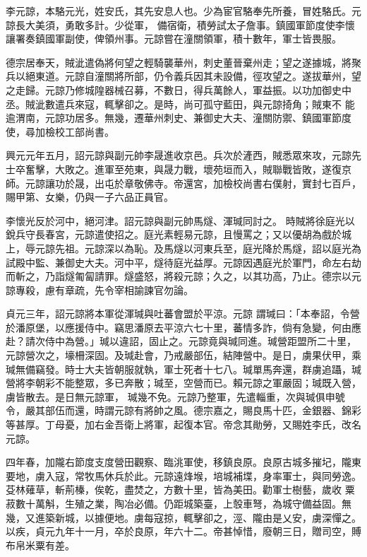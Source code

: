 \begin{pinyinscope}
 李元諒，本駱元光，姓安氏，其先安息人也。少為宦官駱奉先所養，冒姓駱氏。元諒長大美須，勇敢多計。少從軍，
 備宿衛，積勞試太子詹事。鎮國軍節度使李懷讓署奏鎮國軍副使，俾領州事。元諒嘗在潼關領軍，積十數年，軍士皆畏服。



 德宗居奉天，賊泚遣偽將何望之輕騎襲華州，刺史董晉棄州走；望之遂據城，將聚兵以絕東道。元諒自潼關將所部，仍令義兵因其未設備，徑攻望之。遂拔華州，望之走歸。元諒乃修城隍器械召募，不數日，得兵萬餘人，軍益振。以功加御史中丞。賊泚數遣兵來寇，輒擊卻之。是時，尚可孤守藍田，與元諒掎角；賊東不
 能逾渭南，元諒功居多。無幾，遷華州刺史、兼御史大夫、潼關防禦、鎮國軍節度使，尋加檢校工部尚書。



 興元元年五月，詔元諒與副元帥李晟進收京邑。兵次於滻西，賊悉眾來攻，元諒先士卒奮擊，大敗之。進軍至苑東，與晟力戰，壞苑垣而入，賊聯戰皆敗，遂復京師。元諒讓功於晟，出屯於章敬佛寺。帝還宮，加檢校尚書右僕射，實封七百戶，賜甲第、女樂，仍與一子六品正員官。



 李懷光反於河中，絕河津。詔元諒與副元帥馬燧、渾瑊同討之。
 時賊將徐庭光以銳兵守長春宮，元諒遣使招之。庭光素輕易元諒，且慢罵之；又以優胡為戲於城上，辱元諒先祖。元諒深以為恥。及馬燧以河東兵至，庭光降於馬燧，詔以庭光為試殿中監、兼御史大夫。河中平，燧待庭光益厚。元諒因遇庭光於軍門，命左右劫而斬之，乃詣燧匍匐請罪。燧盛怒，將殺元諒；久之，以其功高，乃止。德宗以元諒專殺，慮有章疏，先令宰相諭諫官勿論。



 貞元三年，詔元諒將本軍從渾瑊與吐蕃會盟於平涼。元諒
 謂瑊曰：「本奉詔，令營於潘原堡，以應援侍中。竊思潘原去平涼六七十里，蕃情多詐，倘有急變，何由應赴？請次侍中為營。」瑊以違詔，固止之。元諒竟與瑊同進。瑊營距盟所二十里，元諒營次之，壕柵深固。及瑊赴會，乃戒嚴部伍，結陣營中。是日，虜果伏甲，乘瑊無備竊發。時士大夫皆朝服就執，軍士死者十七八。瑊單馬奔還，群虜追躡，瑊營將李朝彩不能整眾，多已奔散；瑊至，空營而已。賴元諒之軍嚴固；瑊既入營，虜皆散去。是日無元諒軍，
 瑊幾不免。元諒乃整軍，先遣輜重，次與瑊俱申號令，嚴其部伍而還，時謂元諒有將帥之風。德宗嘉之，賜良馬十匹，金銀器、錦彩等甚厚。丁母憂，加右金吾衛上將軍，起復本官。帝念其勛勞，又賜姓李氏，改名元諒。



 四年春，加隴右節度支度營田觀察、臨洮軍使，移鎮良原。良原古城多摧圮，隴東要地，虜入寇，常牧馬休兵於此。元諒遠烽堠，培城補堞，身率軍士，與同勞逸。芟林薙草，斬荊榛，俟乾，盡焚之，方數十里，皆為美田。勸軍士樹藝，歲收
 粟菽數十萬斛，生殖之業，陶冶必備。仍距城築臺，上彀車弩，為城守備益固。無幾，又進築新城，以據便地。虜每寇掠，輒擊卻之，涇、隴由是乂安，虜深憚之。以疾，貞元九年十一月，卒於良原，年六十二。帝甚悼惜，廢朝三日，贈司空，賻布帛米粟有差。




\end{pinyinscope}
